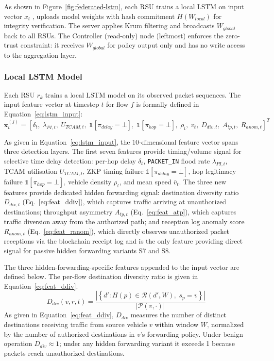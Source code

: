 \documentclass[12pt, a4paper]{report}
\begin{document}
As shown in Figure~\ref{fig:federated-lstm}, each RSU trains a
local LSTM on input vector $x_t$ , uploads model weights with hash
commitment $H(W_{local})$ for integrity verification. The server
applies Krum filtering and broadcasts $W_{global}$ back to all RSUs.
The Controller (read-only) node (leftmost) enforces the zero-trust
constraint: it receives $W_{global}$ for policy output only and has
no write access to the aggregation layer.

\subsubsection{Local LSTM Model}
Each RSU $r_k$ trains a local LSTM model on its observed packet
sequences. The input feature vector at timestep $t$ for flow $f$
is formally defined in Equation~\eqref{eq:lstm_input}:
\begin{equation}
\mathbf{x}_t^{(f)} = \left[
\delta_t,\;
\lambda_{PI,t},\;
U_{TCAM,t},\;
\mathbb{1}[\pi_{delay}{=}\bot],\;
\mathbb{1}[\pi_{hop}{=}\bot],\;
\rho_t,\;
\bar{v}_t,\;
D_{div,t},\;
A_{tp,t},\;
R_{anom,t}
\right]^T
\label{eq:lstm_input}
\end{equation}

As given in Equation~\eqref{eq:lstm_input}, the
10-dimensional feature vector spans three detection
layers. The first seven features provide
timing/volume signal for selective time delay
detection: per-hop delay $\delta_t$,
\texttt{PACKET\_IN} flood rate $\lambda_{PI,t}$,
\ac{TCAM} utilisation $U_{TCAM,t}$, \ac{ZKP} timing
failure $\mathbb{1}[\pi_{delay}{=}\bot]$,
hop-legitimacy failure $\mathbb{1}[\pi_{hop}{=}\bot]$,
vehicle density $\rho_t$, and mean speed $\bar{v}_t$.
The three new features provide dedicated hidden
forwarding signal: destination diversity ratio
$D_{div,t}$ (Eq.~\ref{eq:feat_ddiv}), which captures
traffic arriving at unauthorized destinations;
throughput asymmetry $A_{tp,t}$
(Eq.~\ref{eq:feat_atp}), which captures traffic
diversion away from the authorized path; and
reception log anomaly score $R_{anom,t}$
(Eq.~\ref{eq:feat_ranom}), which directly observes
unauthorized packet receptions via the blockchain
receipt log and is the only feature providing
direct signal for passive hidden forwarding variants
S7 and S8.

The three hidden-forwarding-specific features appended
to the input vector are defined below. The per-flow
destination diversity ratio is given in
Equation~\eqref{eq:feat_ddiv}.
\begin{equation}
D_{div}(v,r,t) =
\frac{\left|\left\{
d' : H(p) \in \mathcal{R}(d',W),\;
s_p = v
\right\}\right|}{|\mathcal{P}(v,\cdot)|}
\label{eq:feat_ddiv}
\end{equation}
As given in Equation~\eqref{eq:feat_ddiv},
$D_{div}$ measures the number of distinct
destinations receiving traffic from source vehicle
$v$ within window $W$, normalized by the number of
authorized destinations in $v$'s forwarding policy.
Under benign operation $D_{div}{\approx}1$; under any
hidden forwarding variant it exceeds 1 because packets
reach unauthorized destinations.
\end{document}
